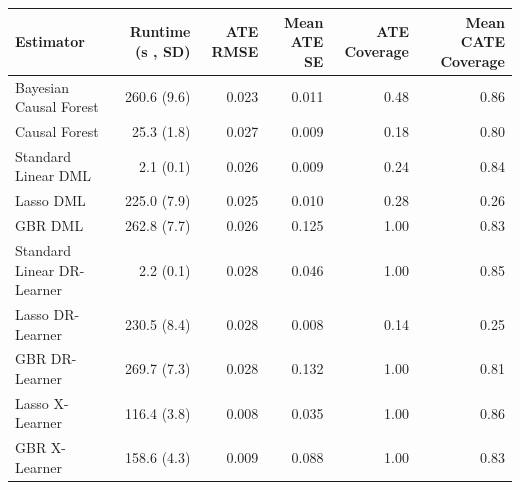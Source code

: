 \begin{tabular}{lrrrrr}
\toprule
                 Estimator & Runtime (s , SD) &  ATE RMSE &  Mean ATE SE &  ATE Coverage &  Mean CATE Coverage \\
\midrule
    Bayesian Causal Forest &      260.6 (9.6) &     0.023 &        0.011 &          0.48 &                0.86 \\
             Causal Forest &       25.3 (1.8) &     0.027 &        0.009 &          0.18 &                0.80 \\
       Standard Linear DML &        2.1 (0.1) &     0.026 &        0.009 &          0.24 &                0.84 \\
                 Lasso DML &      225.0 (7.9) &     0.025 &        0.010 &          0.28 &                0.26 \\
                   GBR DML &      262.8 (7.7) &     0.026 &        0.125 &          1.00 &                0.83 \\
Standard Linear DR-Learner &        2.2 (0.1) &     0.028 &        0.046 &          1.00 &                0.85 \\
          Lasso DR-Learner &      230.5 (8.4) &     0.028 &        0.008 &          0.14 &                0.25 \\
            GBR DR-Learner &      269.7 (7.3) &     0.028 &        0.132 &          1.00 &                0.81 \\
           Lasso X-Learner &      116.4 (3.8) &     0.008 &        0.035 &          1.00 &                0.86 \\
             GBR X-Learner &      158.6 (4.3) &     0.009 &        0.088 &          1.00 &                0.83 \\
\bottomrule
\end{tabular}
